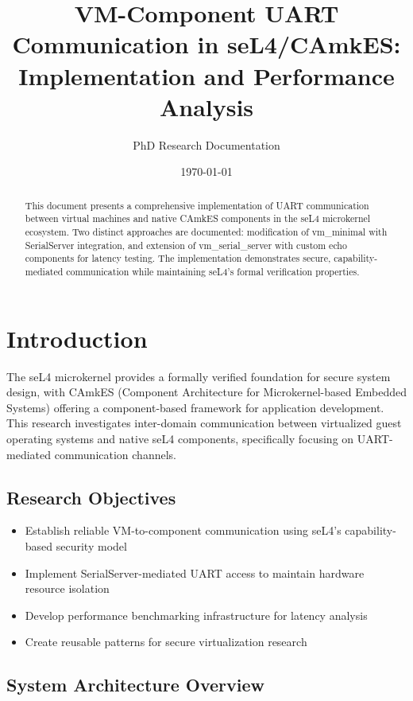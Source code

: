\documentclass[12pt,a4paper]{article}
\title{VM-Component UART Communication in seL4/CAmkES:\\
Implementation and Performance Analysis}
\author{PhD Research Documentation}
\date{\today}
\begin{document}
\maketitle

\begin{abstract}
This document presents a comprehensive implementation of UART communication between virtual machines and native CAmkES components in the seL4 microkernel ecosystem. Two distinct approaches are documented: modification of vm\_minimal with SerialServer integration, and extension of vm\_serial\_server with custom echo components for latency testing. The implementation demonstrates secure, capability-mediated communication while maintaining seL4's formal verification properties.
\end{abstract}

\tableofcontents
\newpage

\section{Introduction}

The seL4 microkernel provides a formally verified foundation for secure system design, with CAmkES (Component Architecture for Microkernel-based Embedded Systems) offering a component-based framework for application development. This research investigates inter-domain communication between virtualized guest operating systems and native seL4 components, specifically focusing on UART-mediated communication channels.

\subsection{Research Objectives}

\begin{itemize}
\item Establish reliable VM-to-component communication using seL4's capability-based security model
\item Implement SerialServer-mediated UART access to maintain hardware resource isolation
\item Develop performance benchmarking infrastructure for latency analysis
\item Create reusable patterns for secure virtualization research
\end{itemize}

\subsection{System Architecture Overview}
\end{document}
